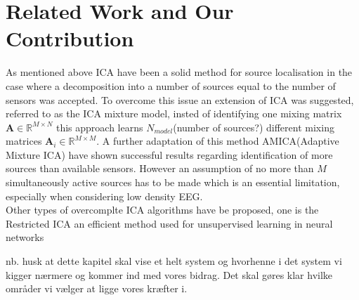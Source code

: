 \section{Related Work and Our Contribution} 
As mentioned above ICA have been a solid method for source localisation in the case where a decomposition into a number of sources equal to the number of sensors was accepted. To overcome this issue an extension of ICA was suggested, referred to as the ICA mixture model, insted of identifying one mixing matrix $\mathbf{A}\in \mathbb{R}^{M\times N}$ this approach learns $N_{model}$(number of sources?) different mixing matrices $\mathbf{A}_i\in \mathbb{R}^{M\times M}$. A further adaptation of this method AMICA(Adaptive Mixture ICA)  have shown successful results regarding identification of more sources than available sensors\cite{Palmer2008}. However an assumption of no more than $M$ simultaneously active sources has to be made which is an essential limitation, especially when considering low density EEG. \\
Other types of overcomplte ICA algorithms have be proposed, one is the Restricted ICA an efficient method used for unsupervised learning in neural networks 
     



nb. husk at dette kapitel skal vise et helt system og hvorhenne i det system vi kigger nærmere og kommer ind med vores bidrag. Det skal gøres klar hvilke områder vi vælger at ligge vores kræfter i.  





 
